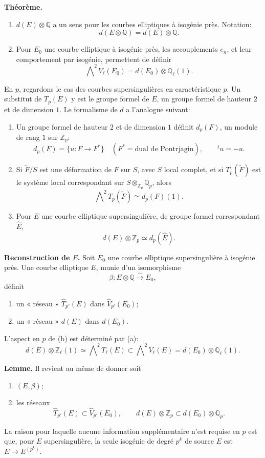 \documentclass[11pt]{article}
\newcommand{\Q}{\mathbb{Q}}
\newcommand{\Qp}{\mathbb{Q}_{p}}
\newcommand{\Zp}{\mathbb{Z}_{p}}
\newcommand{\Ql}{\mathbb{Q}_{\ell}}
\newcommand{\Zl}{\mathbb{Z}_{\ell}}
\newcommand{\wt}{\widetilde}
\newcommand{\wh}{\widehat}
\begin{document}
\textbf{Théorème.}
\begin{enumerate}[label=(\alph*)]
\item \(d(E)\otimes\Q\) a un sens pour les courbes elliptiques à isogénie près. Notation:
\[
d(E\otimes\Q)=d(E)\otimes\Q .
\]
\item Pour \(E_0\) une courbe elliptique à isogénie près, les accouplements \(e_n\), et leur comportement par isogénie, permettent de définir
\[
\bigwedge\nolimits^2 V_{\ell}(E_0)=d(E_0)\otimes\Ql(1).
\]
\end{enumerate}

En \(p\), regardons le cas des courbes supersingulières en caractéristique \(p\). Un substitut de \(T_p(E)\) y est le groupe formel de \(E\), un groupe formel de hauteur \(2\) et de dimension \(1\). Le formalisme de \(d\) a l'analogue suivant:
\begin{enumerate}[label=(\alph*)]
\item Un groupe formel de hauteur \(2\) et de dimension \(1\) définit \(d_p(F)\), un module de rang \(1\) sur \(\Zp\):
\[
d_p(F)=\{u:F\to F^*\}\quad(F^*=\text{dual de Pontrjagin}),\qquad {}^t u=-u .
\]
\item Si \(\wt F/S\) est une déformation de \(F\) sur \(S\), avec \(S\) local complet, et si \(T_p(\wt F)\) est le système local correspondant sur \(S\otimes_{\Zp}\Qp\), alors
\[
\bigwedge\nolimits^2 T_p(\wt F)\simeq d_p(F)(1).
\]
\item Pour \(E\) une courbe elliptique supersingulière, de groupe formel correspondant \(\wh E\),
\[
d(E)\otimes\Zp\simeq d_p(\wh E).
\]
\end{enumerate}

\textbf{Reconstruction de \(E\).} Soit \(E_0\) une courbe elliptique supersingulière à isogénie près. Une courbe elliptique \(E\), munie d'un isomorphisme
\[
\beta:E\otimes\Q\xrightarrow{\sim}E_0,
\]
définit
\begin{enumerate}[label=(\alph*)]
\item un « réseau » \(\wh T_{p'}(E)\) dans \(\wh V_{p'}(E_0)\);
\item un « réseau » \(d(E)\) dans \(d(E_0)\).
\end{enumerate}
L'aspect en \(p\) de (b) est déterminé par (a):
\[
d(E)\otimes\Zl(1)\simeq \bigwedge\nolimits^2T_{\ell}(E)
\subset \bigwedge\nolimits^2V_{\ell}(E)=d(E_0)\otimes\Ql(1).
\]

\textbf{Lemme.} Il revient au même de donner soit
\begin{enumerate}[label=(\alph*)]
\item \((E,\beta)\);
\item les réseaux
\[
\wh T_{p'}(E)\subset\wh V_{p'}(E_0),\qquad
d(E)\otimes\Zp\subset d(E_0)\otimes\Qp .
\]
\end{enumerate}
La raison pour laquelle aucune information supplémentaire n'est requise en \(p\) est que, pour \(E\) supersingulière, la seule isogénie de degré \(p^k\) de source \(E\) est \(E\to E^{(p^k)}\).
\end{document}
